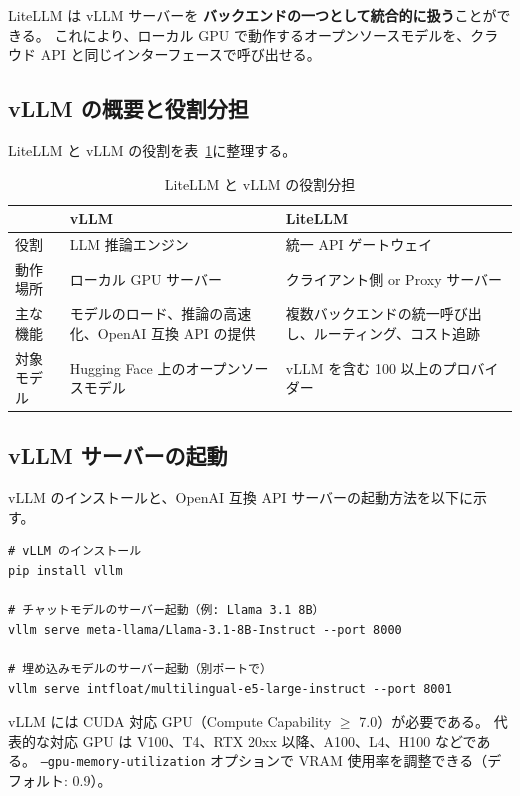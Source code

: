 \documentclass[a4paper,11pt]{ltjsarticle}
\newcommand{\code}[1]{\texttt{#1}}
\begin{document}
LiteLLM は vLLM サーバーを \textbf{バックエンドの一つとして統合的に扱う}ことができる。
これにより、ローカル GPU で動作するオープンソースモデルを、クラウド API と同じインターフェースで呼び出せる。

\subsection{vLLM の概要と役割分担}

LiteLLM と vLLM の役割を表~\ref{tab:vllm_roles}に整理する。

\begin{table}[htbp]
\centering
\caption{LiteLLM と vLLM の役割分担}
\label{tab:vllm_roles}
\begin{tabular}{lp{5cm}p{5cm}}
\toprule
         & \textbf{vLLM} & \textbf{LiteLLM} \\
\midrule
役割     & LLM 推論エンジン & 統一 API ゲートウェイ \\
動作場所 & ローカル GPU サーバー & クライアント側 or Proxy サーバー \\
主な機能 & モデルのロード、推論の高速化、OpenAI 互換 API の提供 & 複数バックエンドの統一呼び出し、ルーティング、コスト追跡 \\
対象モデル & Hugging Face 上のオープンソースモデル & vLLM を含む 100 以上のプロバイダー \\
\bottomrule
\end{tabular}
\end{table}

\subsection{vLLM サーバーの起動}

vLLM のインストールと、OpenAI 互換 API サーバーの起動方法を以下に示す。

\begin{lstlisting}[style=bash]
# vLLM のインストール
pip install vllm

# チャットモデルのサーバー起動（例: Llama 3.1 8B）
vllm serve meta-llama/Llama-3.1-8B-Instruct --port 8000

# 埋め込みモデルのサーバー起動（別ポートで）
vllm serve intfloat/multilingual-e5-large-instruct --port 8001
\end{lstlisting}

\begin{notebox}[GPU 要件]
vLLM には CUDA 対応 GPU（Compute Capability $\geq$ 7.0）が必要である。
代表的な対応 GPU は V100、T4、RTX 20xx 以降、A100、L4、H100 などである。
\code{--gpu-memory-utilization} オプションで VRAM 使用率を調整できる（デフォルト: 0.9）。
\end{notebox}
\end{document}
